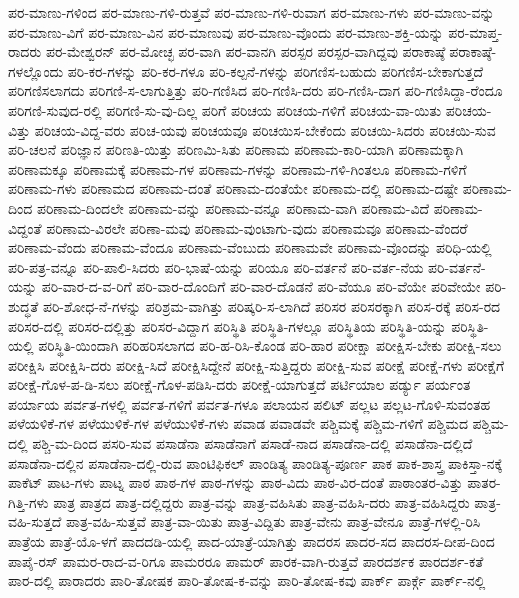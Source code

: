{ಪರ-ಮಾಣು-ಗಳಿಂದ
ಪರ-ಮಾಣು-ಗಳಿ-ರುತ್ತವೆ
ಪರ-ಮಾಣು-ಗಳಿ-ರುವಾಗ
ಪರ-ಮಾಣು-ಗಳು
ಪರ-ಮಾಣು-ವನ್ನು
ಪರ-ಮಾಣು-ವಿಗೆ
ಪರ-ಮಾಣು-ವಿನ
ಪರ-ಮಾಣುವು
ಪರ-ಮಾಣು-ವೊಂದು
ಪರ-ಮಾಣು-ಶಕ್ತಿ-ಯನ್ನು
ಪರ-ಮಾಪ್ತ-ರಾದರು
ಪರ-ಮೇಶ್ವರನ್
ಪರ-ಮೋಚ್ಛ
ಪರ-ವಾಗಿ
ಪರ-ವಾನಗಿ
ಪರಸ್ಪರ
ಪರಸ್ಪರ-ವಾಗಿದ್ದವು
ಪರಾಕಾಷ್ಠೆ
ಪರಾಕಾಷ್ಠೆ-ಗಳಲ್ಲೊಂದು
ಪರಿ-ಕರ-ಗಳನ್ನು
ಪರಿ-ಕರ-ಗಳೂ
ಪರಿ-ಕಲ್ಪನೆ-ಗಳನ್ನು
ಪರಿಗಣಿಸ-ಬಹುದು
ಪರಿಗಣಿಸ-ಬೇಕಾಗುತ್ತದೆ
ಪರಿಗಣಿಸಲಾಗದು
ಪರಿಗಣಿ-ಸ-ಲಾಗುತ್ತಿತ್ತು
ಪರಿ-ಗಣಿಸಿದ
ಪರಿ-ಗಣಿಸಿ-ದರು
ಪರಿ-ಗಣಿಸಿ-ದಾಗ
ಪರಿ-ಗಣಿಸಿದ್ದಾ-ರೆಂದೂ
ಪರಿಗಣಿ-ಸುವುದ-ರಲ್ಲಿ
ಪರಿಗಣಿ-ಸು-ವು-ದಿಲ್ಲ
ಪರಿಗೆ
ಪರಿಚಯ
ಪರಿಚಯ-ಗಳಿಗೆ
ಪರಿಚಯ-ವಾ-ಯಿತು
ಪರಿಚಯ-ವಿತ್ತು
ಪರಿಚಯ-ವಿದ್ದ-ವರು
ಪರಿಚ-ಯವು
ಪರಿಚಯವೂ
ಪರಿಚಯಿಸ-ಬೇಕೆಂದು
ಪರಿಚಯಿ-ಸಿದರು
ಪರಿಚಯಿ-ಸುವ
ಪರಿ-ಚಲನೆ
ಪರಿಜ್ಞಾನ
ಪರಿಣತಿ-ಯಿತ್ತು
ಪರಿಣಮಿ-ಸಿತು
ಪರಿಣಾಮ
ಪರಿಣಾಮ-ಕಾರಿ-ಯಾಗಿ
ಪರಿಣಾಮಕ್ಕಾಗಿ
ಪರಿಣಾಮಕ್ಕೂ
ಪರಿಣಾಮಕ್ಕೆ
ಪರಿಣಾಮ-ಗಳ
ಪರಿಣಾಮ-ಗಳನ್ನು
ಪರಿಣಾಮ-ಗಳಿ-ಗಿಂತಲೂ
ಪರಿಣಾಮ-ಗಳಿಗೆ
ಪರಿಣಾಮ-ಗಳು
ಪರಿಣಾಮದ
ಪರಿಣಾಮ-ದಂತೆ
ಪರಿಣಾಮ-ದಂತೆಯೇ
ಪರಿಣಾಮ-ದಲ್ಲಿ
ಪರಿಣಾಮ-ದಷ್ಟೇ
ಪರಿಣಾಮ-ದಿಂದ
ಪರಿಣಾಮ-ದಿಂದಲೇ
ಪರಿಣಾಮ-ವನ್ನು
ಪರಿಣಾಮ-ವನ್ನೂ
ಪರಿಣಾಮ-ವಾಗಿ
ಪರಿಣಾಮ-ವಿದೆ
ಪರಿಣಾಮ-ವಿದ್ದಂತೆ
ಪರಿಣಾಮ-ವಿರಲೇ
ಪರಿಣಾ-ಮವು
ಪರಿಣಾಮ-ವುಂಟಾಗು-ವುದು
ಪರಿಣಾಮವೂ
ಪರಿಣಾಮ-ವೆಂದರೆ
ಪರಿಣಾಮ-ವೆಂದು
ಪರಿಣಾಮ-ವೆಂದೂ
ಪರಿಣಾಮ-ವೆಂಬುದು
ಪರಿಣಾಮವೇ
ಪರಿಣಾಮ-ವೊಂದನ್ನು
ಪರಿಧಿ-ಯಲ್ಲಿ
ಪರಿ-ಪತ್ರ-ವನ್ನೂ
ಪರಿ-ಪಾಲಿ-ಸಿದರು
ಪರಿ-ಭಾಷೆ-ಯನ್ನು
ಪರಿಯೂ
ಪರಿ-ವರ್ತನೆ
ಪರಿ-ವರ್ತ-ನೆಯ
ಪರಿ-ವರ್ತನೆ-ಯನ್ನು
ಪರಿ-ವಾರ-ದ-ವ-ರಿಗೆ
ಪರಿ-ವಾರ-ದೊಂದಿಗೆ
ಪರಿ-ವಾರ-ದೊಡನೆ
ಪರಿ-ವೆಯೂ
ಪರಿ-ವೆಯೇ
ಪರಿವೇಯೇ
ಪರಿ-ಶುದ್ಧತೆ
ಪರಿ-ಶೋಧ-ನೆ-ಗಳನ್ನು
ಪರಿಶ್ರಮ-ವಾಗಿತ್ತು
ಪರಿಷ್ಕರಿ-ಸ-ಲಾಗಿದೆ
ಪರಿಸರ
ಪರಿಸರಕ್ಕಾಗಿ
ಪರಿಸ-ರಕ್ಕೆ
ಪರಿಸ-ರದ
ಪರಿಸರ-ದಲ್ಲಿ
ಪರಿಸರ-ದಲ್ಲಿತ್ತು
ಪರಿಸರ-ವಿದ್ದಾಗ
ಪರಿಸ್ಥಿತಿ
ಪರಿಸ್ಥಿತಿ-ಗಳಲ್ಲೂ
ಪರಿಸ್ಥಿತಿಯ
ಪರಿಸ್ಥಿತಿ-ಯನ್ನು
ಪರಿಸ್ಥಿತಿ-ಯಲ್ಲಿ
ಪರಿಸ್ಥಿತಿ-ಯಿಂದಾಗಿ
ಪರಿಹರಿಸಲಾಗದ
ಪರಿ-ಹ-ರಿಸಿ-ಕೊಂಡ
ಪರಿ-ಹಾರ
ಪರೀಕ್ಷಾ
ಪರೀಕ್ಷಿಸ-ಬೇಕು
ಪರೀಕ್ಷಿ-ಸಲು
ಪರೀಕ್ಷಿಸಿ
ಪರೀಕ್ಷಿಸಿ-ದರು
ಪರೀಕ್ಷಿ-ಸಿದೆ
ಪರೀಕ್ಷಿಸಿದ್ದೇನೆ
ಪರೀಕ್ಷಿ-ಸುತ್ತಿದ್ದರು
ಪರೀಕ್ಷಿ-ಸುವ
ಪರೀಕ್ಷೆ
ಪರೀಕ್ಷೆ-ಗಳು
ಪರೀಕ್ಷೆಗೆ
ಪರೀಕ್ಷೆ-ಗೊಳ-ಪ-ಡಿ-ಸಲು
ಪರೀಕ್ಷೆ-ಗೊಳ-ಪಡಿಸಿ-ದರು
ಪರೀಕ್ಷೆ-ಯಾಗುತ್ತದೆ
ಪರ್ಟಿಯಾಲ
ಪರ್ಡ್ಯು
ಪರ್ಯಂತ
ಪರ್ಯಾಯ
ಪರ್ವತ-ಗಳಲ್ಲಿ
ಪರ್ವತ-ಗಳಿಗೆ
ಪರ್ವತ-ಗಳೂ
ಪಲಾಯನ
ಪಲಿಟ್
ಪಲ್ಲಟ
ಪಲ್ಲಟ-ಗೊಳಿ-ಸುವಂತಹ
ಪಳೆಯಳಿಕೆ-ಗಳ
ಪಳೆಯುಳಿಕೆ-ಗಳ
ಪಳೆಯುಳಿಕೆ-ಗಳು
ಪವಾಡ
ಪವಾಡವೇ
ಪಶ್ಚಿಮಕ್ಕೆ
ಪಶ್ಚಿಮ-ಗಳಿಗೆ
ಪಶ್ಚಿಮದ
ಪಶ್ಚಿಮ-ದಲ್ಲಿ
ಪಶ್ಚಿ-ಮ-ದಿಂದ
ಪಸರಿ-ಸುವ
ಪಸಾಡೆನಾ
ಪಸಾಡೆನಾಗೆ
ಪಸಾಡೆ-ನಾದ
ಪಸಾಡೆನಾ-ದಲ್ಲಿ
ಪಸಾಡೆನಾ-ದಲ್ಲಿದೆ
ಪಸಾಡೆನಾ-ದಲ್ಲಿನ
ಪಸಾಡೆನಾ-ದಲ್ಲಿ-ರುವ
ಪಾಂಟಿಫಿಕಲ್
ಪಾಂಡಿತ್ಯ
ಪಾಂಡಿತ್ಯ-ಪೂರ್ಣ
ಪಾಕ
ಪಾಕ-ಶಾಸ್ತ್ರ
ಪಾಕಿಸ್ತಾ-ನಕ್ಕೆ
ಪಾಕೆಟ್
ಪಾಟ-ಗಳು
ಪಾಟ್ನ
ಪಾಠ
ಪಾಠ-ಗಳ
ಪಾಠ-ಗಳನ್ನು
ಪಾಠ-ವಿದು
ಪಾಠ-ವಿರ-ದಂತೆ
ಪಾಠಾಂತರ-ವಿತ್ತು
ಪಾತರ-ಗಿತ್ತಿ-ಗಳು
ಪಾತ್ರ
ಪಾತ್ರದ
ಪಾತ್ರ-ದಲ್ಲಿದ್ದರು
ಪಾತ್ರ-ವನ್ನು
ಪಾತ್ರ-ವಹಿಸಿತು
ಪಾತ್ರ-ವಹಿಸಿ-ದರು
ಪಾತ್ರ-ವಹಿಸಿದ್ದರು
ಪಾತ್ರ-ವಹಿ-ಸುತ್ತದೆ
ಪಾತ್ರ-ವಹಿ-ಸುತ್ತವೆ
ಪಾತ್ರ-ವಾ-ಯಿತು
ಪಾತ್ರ-ವಿದ್ದಿತು
ಪಾತ್ರ-ವೇನು
ಪಾತ್ರ-ವೇನೂ
ಪಾತ್ರೆ-ಗಳಲ್ಲಿ-ರಿಸಿ
ಪಾತ್ರೆಯ
ಪಾತ್ರೆ-ಯೊ-ಳಗೆ
ಪಾದದಡಿ-ಯಲ್ಲಿ
ಪಾದ-ಯಾತ್ರೆ-ಯಾಗಿತ್ತು
ಪಾದರಸ
ಪಾದರ-ಸದ
ಪಾದರಸ-ದೀಪ-ದಿಂದ
ಪಾಪೈ-ರಸ್
ಪಾಮರ-ರಾದ-ವ-ರಿಗೂ
ಪಾಮರರೂ
ಪಾಮರ್
ಪಾರಕ-ವಾಗಿ-ರುತ್ತವೆ
ಪಾರದರ್ಶಕ
ಪಾರದರ್ಶ-ಕತೆ
ಪಾರ-ದಲ್ಲಿ
ಪಾರಾದರು
ಪಾರಿ-ತೋಷಕ
ಪಾರಿ-ತೋಷ-ಕ-ವನ್ನು
ಪಾರಿ-ತೋಷ-ಕವು
ಪಾರ್ಕ್
ಪಾರ್ಕ್ಗೆ
ಪಾರ್ಕ್-ನಲ್ಲಿ
}
